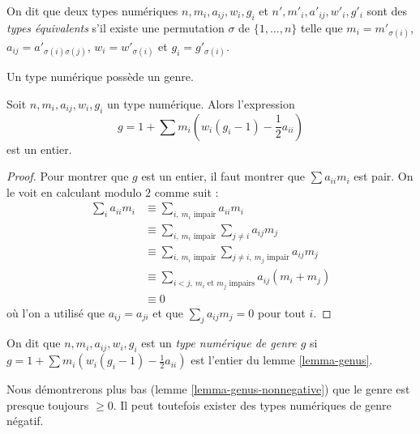 \begin{definition}
\label{definition-type-equivalent}
On dit que deux types numériques $n, m_i, a_{ij}, w_i, g_i$ et
$n', m'_i, a'_{ij}, w'_i, g'_i$ sont des {\it types équivalents} s'il
existe une permutation $\sigma$ de $\{1, \ldots, n\}$
telle que $m_i = m'_{\sigma(i)}$, $a_{ij} = a'_{\sigma(i)\sigma(j)}$,
$w_i = w'_{\sigma(i)}$ et $g_i = g'_{\sigma(i)}$.
\end{definition}

\noindent
Un type numérique possède un genre.

\begin{lemma}
\label{lemma-genus}
Soit $n, m_i, a_{ij}, w_i, g_i$ un type numérique. Alors l'expression
$$
g = 1 + \sum m_i(w_i(g_i - 1) - \frac{1}{2} a_{ii})
$$
est un entier.
\end{lemma}

\begin{proof}
Pour montrer que $g$ est un entier, il faut montrer que $\sum a_{ii}m_i$ est pair.
On le voit en calculant modulo $2$ comme suit :
\begin{align*}
\sum\nolimits_i a_{ii} m_i 
& \equiv
\sum\nolimits_{i,\ m_i\text{ impair}} a_{ii}m_i \\
& \equiv
\sum\nolimits_{i,\ m_i\text{ impair}} \sum\nolimits_{j \not = i} a_{ij}m_j \\
& \equiv
\sum\nolimits_{i,\ m_i\text{ impair}}
\sum\nolimits_{j \not = i,\ m_j\text{ impair}} a_{ij}m_j \\
& \equiv
\sum\nolimits_{i < j,\ m_i\text{ et }m_j\text{ impairs}} a_{ij}(m_i + m_j) \\
& \equiv
0
\end{align*}
où l'on a utilisé que $a_{ij} = a_{ji}$ et que $\sum_j a_{ij}m_j = 0$
pour tout $i$.
\end{proof}

\begin{definition}
\label{definition-genus}
On dit que $n, m_i, a_{ij}, w_i, g_i$ est un {\it type numérique de genre $g$}
si $g = 1 + \sum m_i(w_i(g_i - 1) - \frac{1}{2} a_{ii})$ est l'entier
du lemme \ref{lemma-genus}.
\end{definition}

\noindent
Nous démontrerons plus bas (lemme \ref{lemma-genus-nonnegative}) que le genre
est presque toujours $\geq 0$. Il peut toutefois exister des types numériques de
genre négatif.

